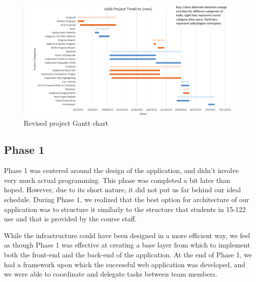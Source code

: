 \documentclass[11pt]{article}
\begin{document}
\begin{figure}[h]
  \includegraphics[width=\linewidth]{new-gantt}
  \caption{Revised project Gantt chart}
  \label{gantt}
\end{figure}
\subsection{Phase 1}
Phase 1 was centered around the design of the application, and didn't involve
very much actual programming. This phase was completed a bit later than hoped.
However, due to its short nature, it did not put us far behind our ideal
schedule. During Phase 1, we realized that the best option for architecture
of our application was to structure it similarly to the structure that students
in 15-122 use and that is provided by the course staff.
\par
While the infrastructure could have been designed in a more efficient way, we
feel as though Phase 1 was effective at creating a base layer from which to
implement both the front-end and the back-end of the application. At the end
of Phase 1, we had a framework upon which the successful web application was
developed, and we were able to coordinate and delegate tasks between team
members.
\end{document}
